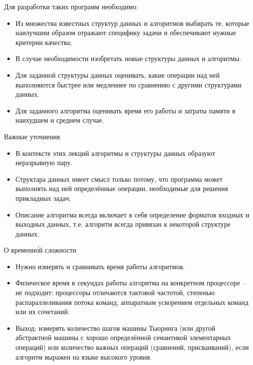 \documentclass[landscape]{slides}
\begin{document}
\begin{slide}
  Для разработки таких программ необходимо:
  \begin{itemize}
    \item Из множества известных структур данных и алгоритмов выбирать те, которые наилучшим образом отражают специфику задачи и
      обеспечивают нужные критерии качества;
    \item В случае необходимости изобретать новые структуры данных и алгоритмы.
    \item Для заданной структуры данных оценивать, какие операции над ней выполняются быстрее или медленнее по сравнению с
      другими структурами данных.
    \item Для заданного алгоритма оценивать время его работы и затраты памяти в наихудшем и среднем случае.
  \end{itemize}
\end{slide}

\begin{slide}
  Важные уточнения
  \begin{itemize}
    \item В контексте этих лекций алгоритмы и структуры данных образуют неразрывную пару.
    \item Структара данных имеет смысл только потому, что программа может выполнять над ней определённые операции,
      необходимые для решения прикладных задач;
    \item Описание алгоритма всегда включает в себя определение форматов входных и выходных данных, т.е. алгоритм всегда
      привязан к некоторой структуре данных.
  \end{itemize}
\end{slide}

\begin{slide}
  О временн\'{о}й сложности
  \begin{itemize}
    \item Нужно измерять и сравнивать время работы алгоритмов.
    \item Физическое время в секундах работы алгоритма на конкретном процессоре~-- не подходит:
      процессоры отличаются тактовой частотой, степенью распараллеливания потока команд, аппаратным ускорением
      отдельных команд или их сочетаний.
    \item Выход: измерять количество шагов машины Тьюринга (или другой абстрактной машины с хорошо определённой семантикой
      элементарных операций) или количество важных операций (сравнений, присваиваний), если алгоритм выражен на языке
      высокого уровня.
  \end{itemize}
\end{slide}
\end{document}
